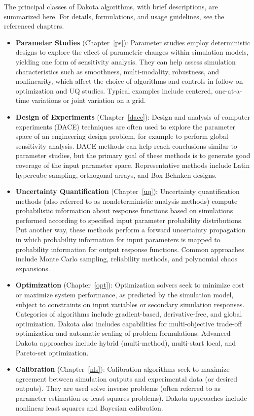 The principal classes of Dakota algorithms, with brief descriptions,
are summarized here.  For details, formulations, and usage guidelines,
see the referenced chapters.
\begin{itemize}
\item {\bf Parameter Studies} (Chapter~\ref{ps}): Parameter studies
  employ deterministic designs to explore the effect of parametric
  changes within simulation models, yielding one form of sensitivity
  analysis.  They can help assess simulation characteristics such as
  smoothness, multi-modality, robustness, and nonlinearity, which
  affect the choice of algorithms and controls in follow-on
  optimization and UQ studies.  Typical examples include centered,
  one-at-a-time variations or joint variation on a grid.

\item {\bf Design of Experiments} (Chapter~\ref{dace}): Design and
  analysis of computer experiments (DACE) techniques are often used to
  explore the parameter space of an engineering design problem, for
  example to perform global sensitivity analysis.  DACE methods can
  help reach conclusions similar to parameter studies, but the primary
  goal of these methods is to generate good coverage of the input
  parameter space.  Representative methods include Latin hypercube
  sampling, orthogonal arrays, and Box-Behnken designs.

\item {\bf Uncertainty Quantification} (Chapter~\ref{uq}): Uncertainty
  quantification methods (also referred to as nondeterministic
  analysis methods) compute probabilistic information about response
  functions based on simulations performed according to specified
  input parameter probability distributions.  Put another way, these
  methods perform a forward uncertainty propagation in which
  probability information for input parameters is mapped to
  probability information for output response functions.  Common
  approaches include Monte Carlo sampling, reliability methods, and
  polynomial chaos expansions.

\item {\bf Optimization} (Chapter~\ref{opt}): Optimization solvers
  seek to minimize cost or maximize system performance, as predicted
  by the simulation model, subject to constraints on input variables
  or secondary simulation responses.  Categories of algorithms
  include gradient-based, derivative-free, and global optimization.
  Dakota also includes capabilities for multi-objective trade-off
  optimization and automatic scaling of problem formulations.  Advanced
  Dakota approaches include hybrid (multi-method), multi-start local,
  and Pareto-set optimization.

\item {\bf Calibration} (Chapter~\ref{nls}): Calibration algorithms
  seek to maximize agreement between simulation outputs and
  experimental data (or desired outputs).  They are used solve inverse
  problems (often referred to as parameter estimation or least-squares
  problems).  Dakota approaches include nonlinear least squares and
  Bayesian calibration.

\end{itemize}

